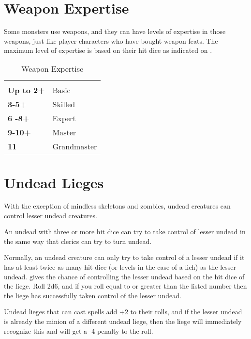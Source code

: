 \begin{multicols*}{2}

\section{Weapon Expertise}

Some monsters use weapons, and they can have levels of expertise in those weapons, just like player characters who have bought weapon feats. The maximum level of expertise is based on their hit dice as indicated on .

\begin {table}[H]
  \caption{Weapon Expertise}\label{tab:Weapon Expertise}
  \begin{tabularx}{\columnwidth}{>{\bfseries}YY}
	 & \\
	Up to 2+ & Basic\\
	3-5+ & Skilled\\
	6 -8+ & Expert\\
	9-10+ & Master\\
	11 & Grandmaster
  \end {tabularx}
\end {table}

\section{Undead Lieges}\label{sec:Undead Lieges}
With the exception of mindless skeletons and zombies, undead creatures can control lesser undead creatures.

An undead with three or more hit dice can try to take control of lesser undead in the same way that clerics can try to turn undead.

Normally, an undead creature can only try to take control of a lesser undead if it has at least twice as many hit dice (or levels in the case of a lich) as the lesser undead.  gives the chance of controlling the lesser undead based on the hit dice of the liege. Roll 2d6, and if you roll equal to or greater than the listed number then the liege has successfully taken control of the lesser undead.

Undead lieges that can cast spells add +2 to their rolls, and if the lesser undead is already the minion of a different undead liege, then the liege will immediately recognize this and will get a -4 penalty to the roll.


\end{multicols*}
